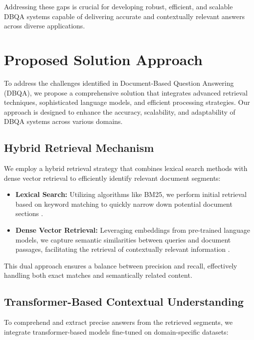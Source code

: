\documentclass[sigconf]{acmart}
\begin{document}
Addressing these gaps is crucial for developing robust, efficient, and scalable DBQA systems capable of delivering accurate and contextually relevant answers across diverse applications.



\section{Proposed Solution Approach}

To address the challenges identified in Document-Based Question Answering (DBQA), we propose a comprehensive solution that integrates advanced retrieval techniques, sophisticated language models, and efficient processing strategies. Our approach is designed to enhance the accuracy, scalability, and adaptability of DBQA systems across various domains.

\subsection{Hybrid Retrieval Mechanism}

We employ a hybrid retrieval strategy that combines lexical search methods with dense vector retrieval to efficiently identify relevant document segments:

\begin{itemize}
    \item \textbf{Lexical Search:} Utilizing algorithms like BM25, we perform initial retrieval based on keyword matching to quickly narrow down potential document sections \cite{turn0search4}.
    \item \textbf{Dense Vector Retrieval:} Leveraging embeddings from pre-trained language models, we capture semantic similarities between queries and document passages, facilitating the retrieval of contextually relevant information \cite{turn0search9}.
\end{itemize}

This dual approach ensures a balance between precision and recall, effectively handling both exact matches and semantically related content.

\subsection{Transformer-Based Contextual Understanding}

To comprehend and extract precise answers from the retrieved segments, we integrate transformer-based models fine-tuned on domain-specific datasets:
\end{document}
